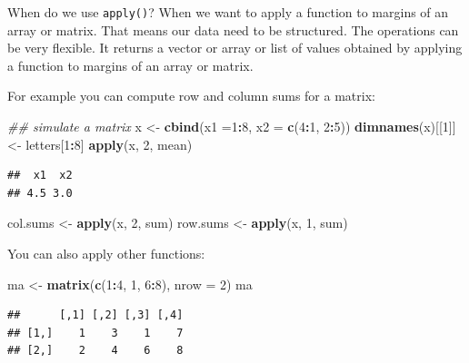 \documentclass[12pt,]{krantz}
\makeatletter
\newenvironment{Shaded}{\begin{snugshade}}{\end{snugshade}}
\newcommand{\CommentTok}[1]{\textcolor[rgb]{0.37,0.37,0.37}{\textit{#1}}}
\newcommand{\DataTypeTok}[1]{\textcolor[rgb]{0.27,0.27,0.27}{#1}}
\newcommand{\DecValTok}[1]{\textcolor[rgb]{0.06,0.06,0.06}{#1}}
\newcommand{\KeywordTok}[1]{\textcolor[rgb]{0.27,0.27,0.27}{\textbf{#1}}}
\newcommand{\NormalTok}[1]{#1}
\newcommand{\OperatorTok}[1]{\textcolor[rgb]{0.43,0.43,0.43}{\textbf{#1}}}
\newcommand{\StringTok}[1]{\textcolor[rgb]{0.5,0.5,0.5}{#1}}
\newenvironment{kframe}{%
\medskip{}
\setlength{\fboxsep}{.8em}
 \def\at@end@of@kframe{}%
 \ifinner\ifhmode%
  \def\at@end@of@kframe{\end{minipage}}%
  \begin{minipage}{\columnwidth}%
 \fi\fi%
 \def\FrameCommand##1{\hskip\@totalleftmargin \hskip-\fboxsep
 \colorbox{shadecolor}{##1}\hskip-\fboxsep
     \hskip-\linewidth \hskip-\@totalleftmargin \hskip\columnwidth}%
 \MakeFramed {\advance\hsize-\width
   \@totalleftmargin\z@ \linewidth\hsize
   \@setminipage}}%
 {\par\unskip\endMakeFramed%
 \at@end@of@kframe}
\renewenvironment{Shaded}{\begin{kframe}}{\end{kframe}}
\makeatother
\begin{document}
When do we use \texttt{apply()}? When we want to apply a function to margins of an array or matrix. That means our data need to be structured. The operations can be very flexible. It returns a vector or array or list of values obtained by applying a function to margins of an array or matrix.

For example you can compute row and column sums for a matrix:

\begin{Shaded}
\begin{Highlighting}[]
\CommentTok{## simulate a matrix}
\NormalTok{x <-}\StringTok{ }\KeywordTok{cbind}\NormalTok{(}\DataTypeTok{x1 =}\DecValTok{1}\OperatorTok{:}\DecValTok{8}\NormalTok{, }\DataTypeTok{x2 =} \KeywordTok{c}\NormalTok{(}\DecValTok{4}\OperatorTok{:}\DecValTok{1}\NormalTok{, }\DecValTok{2}\OperatorTok{:}\DecValTok{5}\NormalTok{))}
\KeywordTok{dimnames}\NormalTok{(x)[[}\DecValTok{1}\NormalTok{]] <-}\StringTok{ }\NormalTok{letters[}\DecValTok{1}\OperatorTok{:}\DecValTok{8}\NormalTok{]}
\KeywordTok{apply}\NormalTok{(x, }\DecValTok{2}\NormalTok{, mean)}
\end{Highlighting}
\end{Shaded}

\begin{verbatim}
##  x1  x2 
## 4.5 3.0
\end{verbatim}

\begin{Shaded}
\begin{Highlighting}[]
\NormalTok{col.sums <-}\StringTok{ }\KeywordTok{apply}\NormalTok{(x, }\DecValTok{2}\NormalTok{, sum)}
\NormalTok{row.sums <-}\StringTok{ }\KeywordTok{apply}\NormalTok{(x, }\DecValTok{1}\NormalTok{, sum)}
\end{Highlighting}
\end{Shaded}

You can also apply other functions:

\begin{Shaded}
\begin{Highlighting}[]
\NormalTok{ma <-}\StringTok{ }\KeywordTok{matrix}\NormalTok{(}\KeywordTok{c}\NormalTok{(}\DecValTok{1}\OperatorTok{:}\DecValTok{4}\NormalTok{, }\DecValTok{1}\NormalTok{, }\DecValTok{6}\OperatorTok{:}\DecValTok{8}\NormalTok{), }\DataTypeTok{nrow =} \DecValTok{2}\NormalTok{)}
\NormalTok{ma}
\end{Highlighting}
\end{Shaded}

\begin{verbatim}
##      [,1] [,2] [,3] [,4]
## [1,]    1    3    1    7
## [2,]    2    4    6    8
\end{verbatim}
\end{document}
